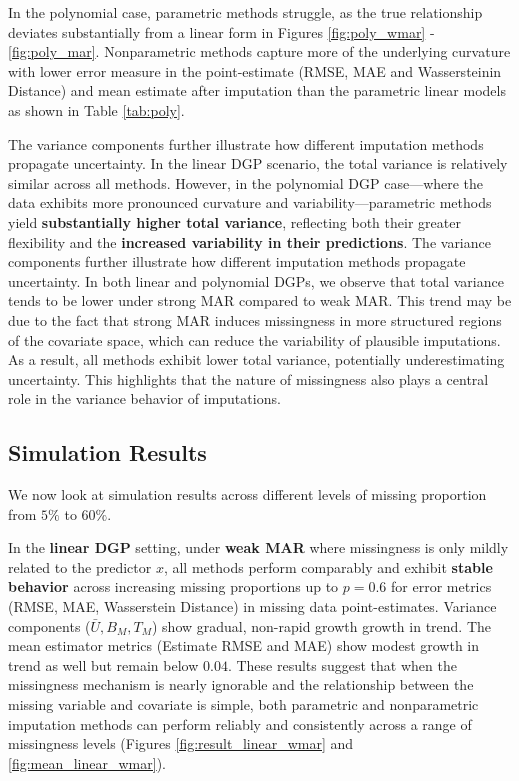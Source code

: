 \documentclass[12pt,oneside]{amsart}
\theoremstyle{definition}
\theoremstyle{remark}
\numberwithin{equation}{section}
\begin{document}
In the polynomial case, parametric methods struggle, as the true relationship deviates substantially from a linear form in Figures \ref{fig:poly_wmar} - \ref{fig:poly_mar}. Nonparametric methods capture more of the underlying curvature with lower error measure in the point-estimate (RMSE, MAE and Wassersteinin Distance) and mean estimate after imputation than the parametric linear models as shown in Table \ref{tab:poly}. 

The variance components further illustrate how different imputation methods propagate uncertainty. In the linear DGP scenario, the total variance is relatively similar across all methods. However, in the polynomial DGP case—where the data exhibits more pronounced curvature and variability—parametric methods yield \textbf{substantially higher total variance}, reflecting both their greater flexibility and the \textbf{increased variability in their predictions}. The variance components further illustrate how different imputation methods propagate uncertainty. In both linear and polynomial DGPs, we observe that total variance tends to be lower under strong MAR compared to weak MAR. This trend may be due to the fact that strong MAR induces missingness in more structured regions of the covariate space, which can reduce the variability of plausible imputations. As a result, all methods exhibit lower total variance, potentially underestimating uncertainty. This highlights that the nature of missingness also plays a central role in the variance behavior of imputations.

\subsection{Simulation Results}
We now look at simulation results across different levels of missing proportion from $5\%$ to $60\%$.

In the \textbf{linear DGP} setting, under \textbf{weak MAR} where missingness is only mildly related to the predictor $x$, all methods perform comparably and exhibit \textbf{stable behavior} across increasing missing proportions up to $p=0.6$ for error metrics (RMSE, MAE, Wasserstein Distance) in missing data point-estimates. Variance components ($\bar{U}, B_M, T_M$) show gradual, non-rapid growth growth in trend. The mean estimator metrics (Estimate RMSE and MAE) show modest growth in trend as well but remain below $0.04$. These results suggest that when the missingness mechanism is nearly ignorable and the relationship between the missing variable and covariate is simple, both parametric and nonparametric imputation methods can perform reliably and consistently across a range of missingness levels (Figures \ref{fig:result_linear_wmar} and  \ref{fig:mean_linear_wmar}).
\end{document}
